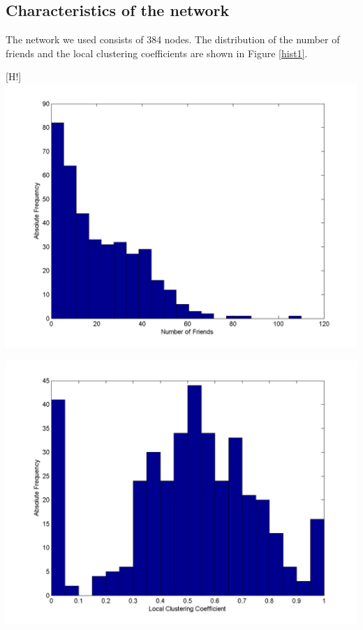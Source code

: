 \subsection{Characteristics of the network}

The network we used consists of 384 nodes. The distribution of the number of friends and the local clustering coefficients are shown in Figure \ref{hist1}.


\begin{minipage}{0.5\textwidth}[H!]
\includegraphics[scale=0.4]{network_degreehist.png}
\end{minipage}
\begin{minipage}{0.5\textwidth}
\includegraphics[scale=0.4]{network_clusterhist.png}
\end{minipage}
\label{hist1}


